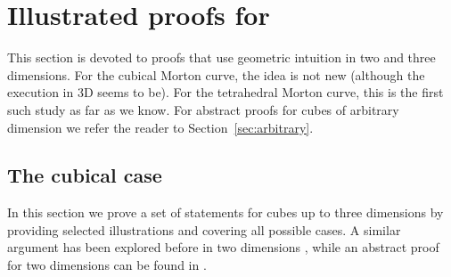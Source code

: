 \documentclass[a4paper,11pt]{article}
\newcommand{\seclab}[1]{\label{sec:#1}}
\newcommand{\secref}[1]{Section~\ref{sec:#1}}
\begin{document}
\section{Illustrated proofs for }
\seclab{illustrated}

This section is devoted to proofs that use geometric intuition in two and
three dimensions.
For the cubical Morton curve, the idea is not new (although the execution in 3D
seems to be).
For the tetrahedral Morton curve, this is the first such study as far as we
know.
For abstract proofs for cubes of arbitrary dimension  we refer the reader to
\secref{arbitrary}.


\subsection{The cubical case}
\seclab{illustrated-cubical}

In this section we prove a set of statements for cubes up to three dimensions
by providing selected illustrations and covering all possible cases.
A similar argument has been explored before in two dimensions \cite{Bader12},
while an abstract proof for two dimensions can be found in
\cite{deBergHaverkortThiteEtAl10}.
\end{document}
